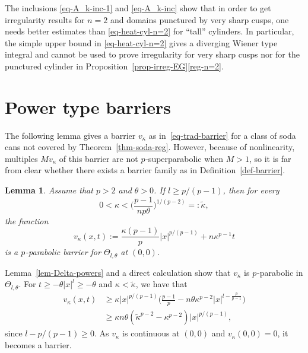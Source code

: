 \documentclass[a4paper, twoside]{article}
\makeatletter
\theoremstyle{propositional}
\newtheorem{lem}[thm]{Lemma}
\theoremstyle{descriptive}
\renewenvironment{proof}[1][\proofname]{\par
  \pushQED{\qed}%
  \normalfont
  \trivlist
  \item[\hskip\labelsep
        \itshape
    #1\@addpunct{.}]\ignorespaces
}{%
  \popQED\endtrivlist\@endpefalse
}
\numberwithin{equation}{section}
\newcommand{\ka}{\kappa}
\newcommand{\kat}{{\tilde{\ka}}}
\newcommand{\p}{{$p\mspace{1mu}$}}
\makeatother
\begin{document}
The inclusions \eqref{eq-A_k-inc-1} and \eqref{eq-A_k-inc} show
that in order to get irregularity results for $n=2$ and 
domains punctured by very sharp cusps,
one needs better estimates than \eqref{eq-heat-cyl-n=2} for ``tall'' cylinders.
In particular, the simple upper bound in \eqref{eq-heat-cyl-n=2} gives
a diverging Wiener type integral and cannot be used to prove irregularity
for very sharp cusps nor for the punctured cylinder in
Proposition~\ref{prop-irreg-EG}\ref{reg-n=2}.



\section{Power type barriers}
\label{sect-trad-bar}

The following lemma gives a 
barrier $v_\ka$ as in~\eqref{eq-trad-barrier} 
for a class of soda cans not covered by
Theorem~\ref{thm-soda-reg}.
However, because of nonlinearity, multiples $Mv_\ka$ 
of this barrier are not \p-superparabolic when $M>1$,
so it is far from clear whether there exists a barrier family as in Definition~\ref{def-barrier}.

\begin{lem}  \label{lem-simple-barrier}
Assume that $p>2$ and $\theta>0$.
If $l\ge p/(p-1)$, then
for every 
\begin{equation*}  %
0<\ka< \biggl( \frac{p-1}{np\theta}  \biggr)^{1/(p-2)} =: \kat,
\end{equation*}
the function
\begin{equation} \label{eq-vka}
v_\ka (x,t) := \frac{\ka(p-1)}{p}  |x|^{p/(p-1)} + n \ka^{p-1}t 
\end{equation}
is a \p-parabolic barrier for $\Theta_{l,\theta}$ at $(0,0)$.
\end{lem}

\begin{proof}
Lemma~\ref{lem-Delta-powers} and a direct calculation show 
that $v_\ka$ is \p-parabolic in $\Theta_{l,\theta}$.
For $t\ge -\theta|x|^l \ge -\theta$ and $\ka<\kat$, 
we have that
\begin{align*}
v_\ka(x,t) 
&\ge  \ka |x|^{p/(p-1)} \biggl( \frac{p-1}{p} - n\theta \ka^{p-2} |x|^{l-\frac{p}{p-1}}  \biggr) \\
&\ge  \ka n\theta (\kat^{p-2} - \ka^{p-2}) |x|^{p/(p-1)},
\end{align*}
since $l-p/(p-1)\ge0$.
As $v_\ka$ is continuous at $(0,0)$ and $v_\ka(0,0)=0$, it becomes a  barrier.
\end{proof}
\end{document}
